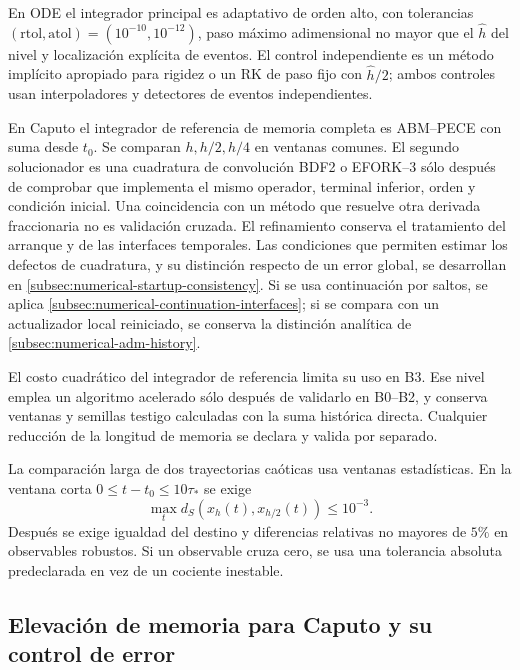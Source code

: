 En ODE el integrador principal es adaptativo de orden alto, con tolerancias
\((\mathrm{rtol},\mathrm{atol})=(10^{-10},10^{-12})\), paso máximo adimensional
no mayor que el \(\widehat h\) del nivel y localización explícita de eventos. El control
independiente es un método implícito apropiado para rigidez o un RK de paso
fijo con \(\widehat h/2\); ambos controles usan interpoladores y detectores
de eventos independientes.

En Caputo el integrador de referencia de memoria completa es ABM--PECE con suma desde \(t_0\).
Se comparan \(h,h/2,h/4\) en ventanas comunes. El segundo solucionador es
una cuadratura de convolución BDF2 o EFORK--3 sólo después de comprobar que
implementa el mismo operador, terminal inferior, orden y condición inicial.
Una coincidencia con un método que resuelve otra derivada fraccionaria no es
validación cruzada.
El refinamiento conserva el tratamiento del arranque y de las interfaces
temporales. Las condiciones que permiten estimar los defectos de cuadratura,
y su distinción respecto de un error global, se desarrollan en
\cref{subsec:numerical-startup-consistency}. Si se usa continuación por
saltos, se aplica \cref{subsec:numerical-continuation-interfaces}; si se
compara con un actualizador local reiniciado, se conserva la distinción
analítica de \cref{subsec:numerical-adm-history}.

El costo cuadrático del integrador de referencia limita su uso en B3.
Ese nivel emplea un algoritmo acelerado sólo después de validarlo en B0--B2,
y conserva ventanas y semillas testigo calculadas con la suma histórica
directa. Cualquier reducción de la longitud de memoria se declara y valida por
separado.

La comparación larga de dos trayectorias caóticas usa ventanas estadísticas.
En la ventana corta \(0\leq t-t_0\leq10\tau_*\) se exige
\begin{equation}
 \max_t d_S(x_h(t),x_{h/2}(t))\leq10^{-3}.
 \label{camp:eq-short-error}
\end{equation}
Después se exige igualdad del destino y diferencias relativas no mayores de
\(5\%\) en observables robustos. Si un observable cruza cero, se usa una
tolerancia absoluta predeclarada en vez de un cociente inestable.

\subsection{Elevación de memoria para Caputo y su control de error}
\label{camp:caputo-lift}

